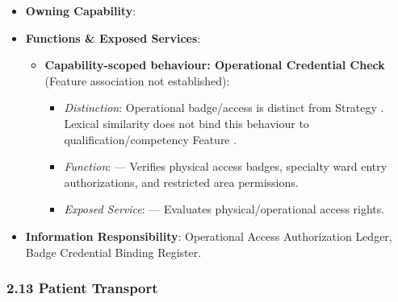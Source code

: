 \begin{itemize}

\item 
\textbf{Owning Capability}: \texttt{}



\item 
\textbf{Functions \& Exposed Services}:


\begin{itemize}

\item 
\textbf{Capability-scoped behaviour: Operational Credential Check} (Feature association not established):


\begin{itemize}

\item 
\emph{Distinction}: Operational badge/\allowbreak{}access \texttt{} is distinct from Strategy \texttt{}. Lexical similarity does not bind this behaviour to qualification/\allowbreak{}competency Feature \texttt{}.



\item 
\emph{Function}: \texttt{} — Verifies physical access badges, specialty ward entry authorizations, and restricted area permissions.



\item 
\emph{Exposed Service}: \texttt{} — Evaluates physical/\allowbreak{}operational access rights.



\end{itemize}


\end{itemize}


\item 
\textbf{Information Responsibility}: Operational Access Authorization Ledger, Badge Credential Binding Register.



\end{itemize}
\label{rad:hso:247}

\par\smallskip
{}\label{rad:hso:249}
\subsubsection*{2.13 Patient Transport}
\label{rad:hso:250}

